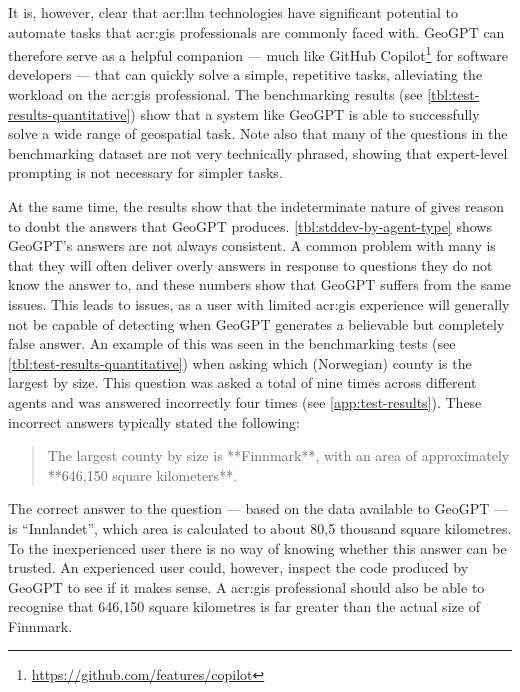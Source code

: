 It is, however, clear that \acrshort{acr:llm} technologies have significant potential to automate tasks that \acrshort{acr:gis} professionals are commonly faced with. GeoGPT can therefore serve as a helpful companion --- much like GitHub Copilot\footnote{\url{https://github.com/features/copilot}} for software developers --- that can quickly solve a simple, repetitive tasks, alleviating the workload on the \acrshort{acr:gis} professional. The benchmarking results (see \autoref{tbl:test-results-quantitative}) show that a system like GeoGPT is able to successfully solve a wide range of geospatial task. Note also that many of the questions in the benchmarking dataset are not very technically phrased, showing that expert-level prompting is not necessary for simpler tasks.

At the same time, the results show that the indeterminate nature of  gives reason to doubt the answers that GeoGPT produces. \autoref{tbl:stddev-by-agent-type} shows GeoGPT's answers are not always consistent. A common problem with many  is that they will often deliver overly answers in response to questions they do not know the answer to, and these numbers show that GeoGPT suffers from the same issues. This leads to issues, as a user with limited \acrshort{acr:gis} experience will generally not be capable of detecting when GeoGPT generates a believable but completely false answer. An example of this was seen in the benchmarking tests (see \autoref{tbl:test-results-quantitative}) when asking which (Norwegian) county is the largest by size. This question was asked a total of nine times across different agents and was answered incorrectly four times (see \autoref{app:test-results}). These incorrect answers typically stated the following:

\begin{quote}
    The largest county by size is **Finnmark**, with an area of approximately **646,150 square kilometers**.
\end{quote}

The correct answer to the question --- based on the data available to GeoGPT --- is \enquote{Innlandet}, which area is calculated to about 80,5 thousand square kilometres. To the inexperienced user there is no way of knowing whether this answer can be trusted. An experienced user could, however, inspect the code produced by GeoGPT to see if it makes sense. A \acrshort{acr:gis} professional should also be able to recognise that 646,150 square kilometres is far greater than the actual size of Finnmark.


